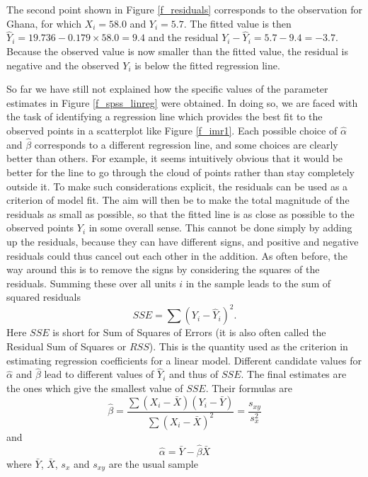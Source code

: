 The second point shown in Figure \ref{f_residuals} corresponds to the
observation for Ghana, for which $X_{i}=58.0$ and $Y_{i}=5.7$. The
fitted value is then $\hat{Y}_{i}=19.736-0.179\times 58.0=9.4$ and the
residual $Y_{i}-\hat{Y}_{i}=5.7-9.4=-3.7$. Because the observed value is
now smaller than the fitted value, the residual is negative and the
observed $Y_{i}$ is below the fitted regression line.

So far we have still not explained how the specific values of the
parameter estimates in Figure \ref{f_spss_linreg} were obtained. In
doing so, we are faced with the task of identifying a regression line
which provides the best fit to the observed points in a scatterplot like
Figure \ref{f_imr1}. Each possible choice of $\hat{\alpha}$ and
$\hat{\beta}$ corresponds to a different regression line, and some
choices are clearly better than others. For example, it seems
intuitively obvious that it would be better for the line to go through
the cloud of points rather than stay completely outside it. To make such
considerations explicit, the residuals can be used as a criterion of
model fit. The aim will then be to make the total magnitude of the
residuals as small as possible, so that the fitted line is as close as
possible to the observed points $Y_{i}$ in some overall sense. This
cannot be done simply by adding up the residuals, because they can have
different signs, and positive and negative residuals could thus cancel
out each other in the addition. As often before, the way around this is
to remove the signs by considering the squares of the residuals. Summing
these over all units $i$ in the sample leads to the sum of squared residuals
\[
SSE = \sum (Y_{i}-\hat{Y}_{i})^{2}.
\]
Here $SSE$ is short for Sum of Squares of Errors (it is also
often called the Residual Sum of Squares or $RSS$). This is the quantity
used as the criterion in estimating regression coefficients for a linear
model. Different candidate values for $\hat{\alpha}$ and $\hat{\beta}$
lead to different values of $\hat{Y}_{i}$ and thus of $SSE$. The
final estimates are the ones which give the
smallest value of $SSE$. Their formulas are
\begin{equation}
\hat{\beta}=
\frac{
\sum (X_{i}-\bar{X})(Y_{i}-\bar{Y})}
{\sum (X_{i}-\bar{X})^{2}}
=\frac{s_{xy}}{s_{x}^{2}}
\label{ols_b}
\end{equation}
and
\begin{equation}
\hat{\alpha}=\bar{Y}-\hat{\beta}\bar{X}
\label{ols_a}
\end{equation}
where $\bar{Y}$, $\bar{X}$, $s_{x}$ and $s_{xy}$ are the usual sample
